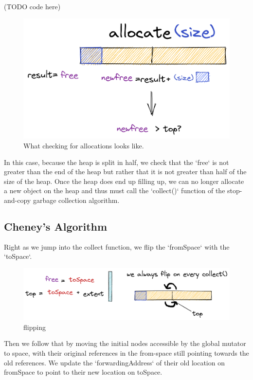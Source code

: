 \documentclass[index]{subfiles}
\begin{document}
(TODO code here)

\begin{figure}[H]
    \centering
    \includegraphics[scale=0.3]{pics/allocation.png}
    \caption{What checking for allocations looks like.}
\end{figure}

In this case, because the heap is split in half, we check that the `free` is not greater than the end of the heap but rather that it is not greater than half of the size of the heap. Once the heap does end up filling up, we can no longer allocate a new object on the heap and thus must call the `collect()` function of the stop-and-copy garbage collection algorithm.

\subsection{Cheney's Algorithm}

Right as we jump into the collect function, we flip the `fromSpace` with the `toSpace`.

\begin{figure}[H]
    \centering
    \includegraphics[scale=0.3]{pics/flipping.png}
    \caption{flipping}
\end{figure}

Then we follow that by moving the initial nodes accessible by the global mutator to space, with their original references in the from-space still pointing towards the old references. We update the `forwardingAddress` of their old location on fromSpace to point to their new location on toSpace.
\end{document}
